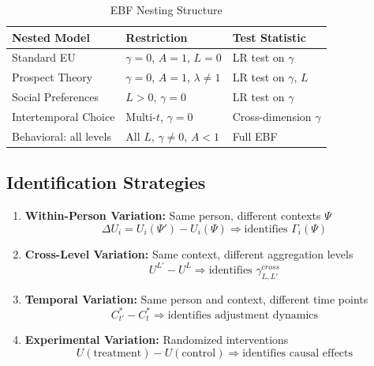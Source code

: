 \begin{table}[htbp]
\centering
\caption{EBF Nesting Structure}
\label{tab:az-nesting}
\renewcommand{\arraystretch}{1.3}
\begin{tabular}{@{}lll@{}}
\toprule
\textbf{Nested Model} & \textbf{Restriction} & \textbf{Test Statistic} \\
\midrule
Standard EU & $\gamma = 0$, $A = 1$, $L = 0$ & LR test on $\gamma$ \\
Prospect Theory & $\gamma = 0$, $A = 1$, $\lambda \neq 1$ & LR test on $\gamma$, $L$ \\
Social Preferences & $L > 0$, $\gamma = 0$ & LR test on $\gamma$ \\
Intertemporal Choice & Multi-$t$, $\gamma = 0$ & Cross-dimension $\gamma$ \\
Behavioral: all levels & All $L$, $\gamma \neq 0$, $A < 1$ & Full EBF \\
\bottomrule
\end{tabular}
\end{table}

\subsection{Identification Strategies}

\begin{enumerate}
\item \textbf{Within-Person Variation:} Same person, different contexts $\Psi$
\begin{equation}
\Delta U_i = U_i(\Psi') - U_i(\Psi) \Rightarrow \text{identifies } \Gamma_i(\Psi)
\end{equation}

\item \textbf{Cross-Level Variation:} Same context, different aggregation levels
\begin{equation}
U^{L'} - U^L \Rightarrow \text{identifies } \gamma^{cross}_{L,L'}
\end{equation}

\item \textbf{Temporal Variation:} Same person and context, different time points
\begin{equation}
C^*_{t'} - C^*_t \Rightarrow \text{identifies adjustment dynamics}
\end{equation}

\item \textbf{Experimental Variation:} Randomized interventions
\begin{equation}
U(\text{treatment}) - U(\text{control}) \Rightarrow \text{identifies causal effects}
\end{equation}
\end{enumerate}

